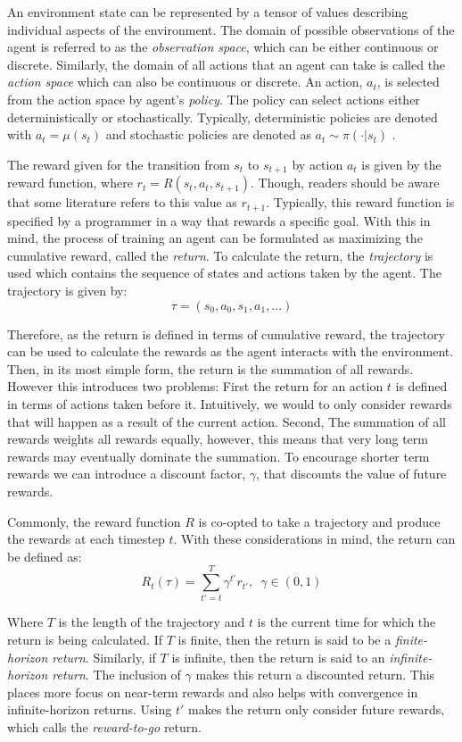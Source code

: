 \documentclass[conference]{IEEEtran}
\begin{document}
An environment state can be represented by a tensor of values describing individual aspects of the environment. The domain of possible observations of the agent is referred to as the \textit{observation space}, which can be either continuous or discrete. Similarly, the domain of all actions that an agent can take is called the \textit{action space} which can also be continuous or discrete. An action, $a_t$, is selected from the action space by agent's \textit{policy}. The policy can select actions either deterministically or stochastically. Typically, deterministic policies are denoted with $a_t = \mu(s_t)$ and stochastic policies are denoted as $a_t \sim \pi(\cdot | s_t)$ \cite{spinning_up_intro}.



The reward given for the transition from $s_t$ to $s_{t+1}$ by action $a_t$ is given by the reward function, where $r_t = R(s_t, a_t, s_{t+1})$. Though, readers should be aware that some literature refers to this value as $r_{t+1}$. Typically, this reward function is specified by a programmer in a way that rewards a specific goal. With this in mind, the process of training an agent can be formulated as maximizing the cumulative reward, called the \textit{return}. To calculate the return, the \textit{trajectory} is used which contains the sequence of states and actions taken by the agent. The trajectory is given by:
$$
    \tau = (s_0, a_0, s_1, a_1, ...)
$$

Therefore, as the return is defined in terms of cumulative reward, the trajectory can be used to calculate the rewards as the agent interacts with the environment. Then, in its most simple form, the return is the summation of all rewards. However this introduces two problems: First the return for an action $t$ is defined in terms of actions taken before it. Intuitively, we would to only consider rewards that will happen as a result of the current action. Second, The summation of all rewards weights all rewards equally, however, this means that very long term rewards may eventually dominate the summation. To encourage shorter term rewards we can introduce a discount factor, $\gamma$, that discounts the value of future rewards.

Commonly, the reward function $R$ is co-opted to take a trajectory and produce the rewards at each timestep $t$. With these considerations in mind, the return can be defined as:
$$
    R_t(\tau) = \sum_{t'=t}^T \gamma^{t'} r_{t'}, \enspace \gamma \in (0, 1)
$$

Where $T$ is the length of the trajectory and $t$ is the current time for which the return is being calculated. If $T$ is finite, then the return is said to be a \textit{finite-horizon return}. Similarly, if $T$ is infinite, then the return is said to an \textit{infinite-horizon return}. The inclusion of $\gamma$ makes this return a discounted return. This places more focus on near-term rewards and also helps with convergence in infinite-horizon returns. Using $t'$ makes the return only consider future rewards, which \cite{spinning_up_policy_optimization} calls the \textit{reward-to-go} return.
\end{document}
